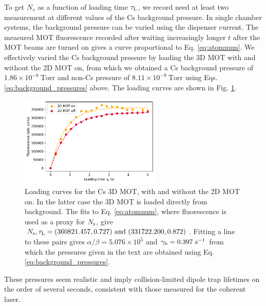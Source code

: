To get $N_s$ as a function of loading time $\tau_{\text L}$, we record need at least two measurement at different values of the Cs background pressure. In single chamber systems, the background pressure can be varied using the dispenser current. The measured MOT fluorescence recorded after waiting increasingly longer $t$ after the MOT beams are turned on gives a curve proportional to Eq. \ref{eq:atomnum}. We effectively varied the Cs background pressure by loading the 3D MOT with and without the 2D MOT on, from which we obtained a Cs background pressure of $1.86\times10^{-8} ~\text{Torr}$ and non-Cs pressure of $8.11\times10^{-9} ~\text{Torr}$ using Eqs.  \ref{eq:background_pressures} above. The loading curves are shown in Fig. \ref{fig:CsMOT_loading}.

\begin{figure}
    \centering
    \includegraphics[width=0.6\textwidth]{Images/CsMOT_loading_curves.pdf}
    \caption{Loading curves for the Cs 3D MOT, with and without the 2D MOT on. In the latter case the 3D MOT is loaded directly from background. The fits to Eq. \ref{eq:atomnum}, where fluorescence is used as a proxy for $N_{\text s}$, give $N_{\text s},\tau_{\text L}=(360821.457,0.727)~\text{and}~(331722.200,0.872)$. Fitting a line to these pairs gives $\alpha/\beta=5.076\times10^5$ and $\gamma_{\text b}=0.397 ~\text{s}^{-1}$ from which the pressures given in the text are obtained using Eq. \ref{eq:background_pressures}.}
    \label{fig:CsMOT_loading}
\end{figure}

These pressures seem realistic and imply collision-limited dipole trap lifetimes on the order of several seconds, consistent with those measured for the coherent laser.

% 
%
